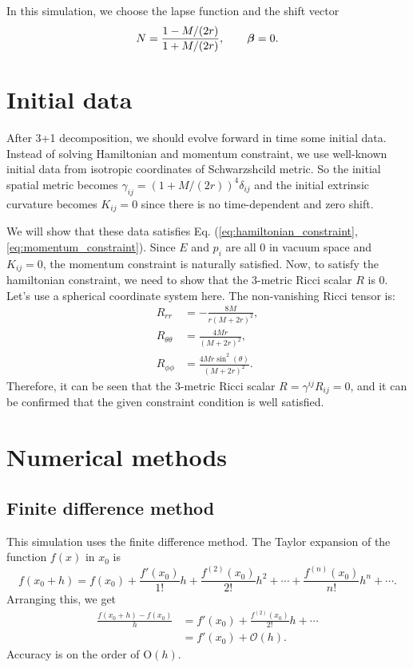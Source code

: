 In this simulation, we choose the lapse function and the shift vector
\begin{equation}
	N = \frac{1-M/(2r)}{1+M/(2r)}, \qquad \bm{\beta} = 0.
\end{equation}

\section{Initial data}
After 3+1 decomposition, we should evolve forward in time some initial data. Instead of solving Hamiltonian and momentum constraint, we use well-known initial data from isotropic coordinates of Schwarzshcild metric. So the initial spatial metric becomes $\gamma_{ij}=(1+M/(2r))^4\delta_{ij}$ and the initial extrinsic curvature becomes $K_{ij} = 0$ since there is no time-dependent and zero shift.

We will show that these data satisfies Eq. (\ref{eq:hamiltonian_constraint}, \ref{eq:momentum_constraint}). Since $E$ and $p_i$ are all $0$ in vacuum space and $K_{ij}=0$, the momentum constraint is naturally satisfied. Now, to satisfy the hamiltonian constraint, we need to show that the 3-metric Ricci scalar $R$ is $0$. Let's use a spherical coordinate system here. The non-vanishing Ricci tensor is:
\begin{align}
	R_{rr} &= - \frac{8 M}{r \left(M + 2 r\right)^{2}},\\
	R_{\theta\theta} &= \frac{4 M r}{\left(M + 2 r\right)^{2}},\\
	R_{\phi\phi} &= \frac{4 M r \sin^{2}{\left(\theta \right)}}{\left(M + 2 r\right)^{2}}.
\end{align}
Therefore, it can be seen that the 3-metric Ricci scalar $R = \gamma^{ij}R_{ij} = 0$, and it can be confirmed that the given constraint condition is well satisfied.

\section{Numerical methods}
\subsection{Finite difference method}
This simulation uses the finite difference method. The Taylor expansion of the function $f(x)$ in $x_0$ is
\begin{equation}
	f(x_0 + h) = f(x_0) + \frac{f'(x_0)}{1!}h + \frac{f^{(2)}(x_0)}{2!}h^2 + \cdots + \frac{f^{(n)}(x_0)}{n!}h^n+ \cdots .
\end{equation}
Arranging this, we get
\begin{equation}
	\begin{aligned}
		\frac{f(x_0 + h) - f(x_0)}{h} &= f'(x_0) + \frac{f^{(2)}(x_0)}{2!}h + \cdots \\
		&= f'(x_0) + \mathcal{O}(h).
	\end{aligned}
\end{equation}
Accuracy is on the order of $\mathrm{O}(h)$.

